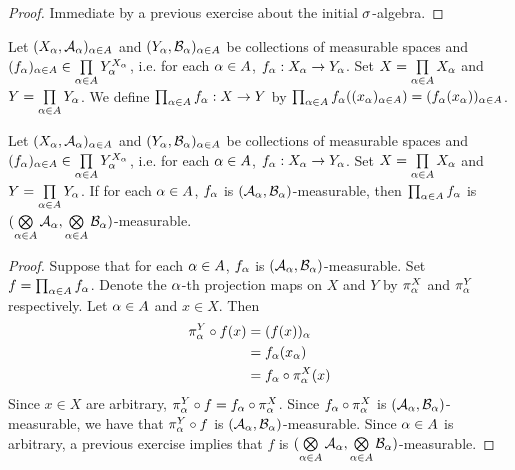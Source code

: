 \documentclass{book}
\begin{document}
	\begin{proof}
		Immediate by a previous exercise about the initial $\sigma$-algebra.
	\end{proof}
	
	\begin{defn} 
		Let $(X_{\alpha}, \mathcal{A}_{\alpha})_{\alpha \in A}$ and $(Y_{\alpha}, \mathcal{B}_{\alpha})_{\alpha \in A}$ be collections of measurable spaces and $(f_{\alpha})_{\alpha \in A} \in \prod\limits_{\alpha \in A} Y_{\alpha}^{X_{\alpha}}$, i.e. for each $\alpha \in A$, $f_{\alpha}:X_{\alpha} \rightarrow Y_{\alpha}$. Set $X = \prod\limits_{\alpha \in A} X_{\alpha}$ and $Y = \prod\limits_{\alpha \in A}Y_{\alpha}$. We define $\prod_{\alpha \in A} f_{\alpha}: X \rightarrow Y$ by $\prod_{\alpha \in A} f_{\alpha} ((x_{\alpha})_{\alpha \in A}) = (f_{\alpha}(x_{\alpha}))_{\alpha \in A}$.
	\end{defn}
	
	\begin{ex} 
		Let $(X_{\alpha}, \mathcal{A}_{\alpha})_{\alpha \in A}$ and $(Y_{\alpha}, \mathcal{B}_{\alpha})_{\alpha \in A}$ be collections of measurable spaces and $(f_{\alpha})_{\alpha \in A} \in \prod\limits_{\alpha \in A} Y_{\alpha}^{X_{\alpha}}$, i.e. for each $\alpha \in A$, $f_{\alpha}:X_{\alpha} \rightarrow Y_{\alpha}$. Set $X = \prod\limits_{\alpha \in A} X_{\alpha}$ and $Y = \prod\limits_{\alpha \in A}Y_{\alpha}$. If for each $\alpha \in A$, $f_{\alpha}$ is $(\mathcal{A}_{\alpha}, \mathcal{B}_{\alpha})$-measurable, then $\prod_{\alpha \in A} f_{\alpha}$ is $(\bigotimes\limits_{\alpha \in A} \mathcal{A}_{\alpha}, \bigotimes\limits_{\alpha \in A} \mathcal{B}_{\alpha})$-measurable.
	\end{ex}
	
	\begin{proof} Suppose that for each $\alpha \in A$, $f_{\alpha}$ is $(\mathcal{A}_{\alpha}, \mathcal{B}_{\alpha})$-measurable. Set $f = \prod_{\alpha \in A} f_{\alpha}$. Denote the $\alpha$-th projection maps on $X$ and $Y$ by $\pi^X_{\alpha}$ and $\pi^Y_{\alpha}$ respectively. Let $\alpha \in A$ and $x \in X$. Then
		\begin{align*}
			\pi^Y_{\alpha} \circ f(x) 
			& = (f(x))_{\alpha} \\
			& = f_{\alpha}(x_{\alpha}) \\
			& = f_{\alpha} \circ \pi^X_{\alpha}(x) 
		\end{align*}
		Since $x \in X$ are arbitrary, $\pi^Y_{\alpha} \circ f = f_{\alpha} \circ \pi^X_{\alpha}$. Since $f_{\alpha} \circ \pi^X_{\alpha}$ is $(\mathcal{A}_{\alpha}, \mathcal{B}_{\alpha})$-measurable, we have that $\pi^Y_{\alpha} \circ f$ is $(\mathcal{A}_{\alpha}, \mathcal{B}_{\alpha})$-measurable. Since $\alpha \in A$ is arbitrary, a previous exercise implies that $f$ is $(\bigotimes\limits_{\alpha \in A} \mathcal{A}_{\alpha}, \bigotimes\limits_{\alpha \in A} \mathcal{B}_{\alpha})$-measurable.
	\end{proof}
\end{document}
